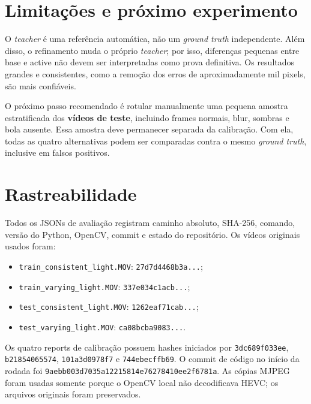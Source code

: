 \documentclass[10pt,a4paper]{article}
\begin{document}
\section{Limitações e próximo experimento}

O \textit{teacher} é uma referência automática, não um \textit{ground truth} independente.
Além disso, o refinamento muda o próprio \textit{teacher}; por isso, diferenças pequenas
entre base e active não devem ser interpretadas como prova definitiva. Os resultados
grandes e consistentes, como a remoção dos erros de aproximadamente mil pixels, são mais
confiáveis.

O próximo passo recomendado é rotular manualmente uma pequena amostra estratificada dos
\textbf{vídeos de teste}, incluindo frames normais, blur, sombras e bola ausente. Essa
amostra deve permanecer separada da calibração. Com ela, todas as quatro alternativas
podem ser comparadas contra o mesmo \textit{ground truth}, inclusive em falsos positivos.

\section{Rastreabilidade}

Todos os JSONs de avaliação registram caminho absoluto, SHA-256, comando, versão do Python,
OpenCV, commit e estado do repositório. Os vídeos originais usados foram:

\begin{itemize}
  \item \texttt{train\_consistent\_light.MOV}: \texttt{27d7d4468b3a...};
  \item \texttt{train\_varying\_light.MOV}: \texttt{337e034c1acb...};
  \item \texttt{test\_consistent\_light.MOV}: \texttt{1262eaf71cab...};
  \item \texttt{test\_varying\_light.MOV}: \texttt{ca08bcba9083...}.
\end{itemize}

Os quatro reports de calibração possuem hashes iniciados por
\texttt{3dc689f033ee}, \texttt{b21854065574}, \texttt{101a3d0978f7} e
\texttt{744ebecffb69}. O commit de código no início da rodada foi
\texttt{9aebb003d7035a12215814e76278410ee2f6781a}. As cópias MJPEG foram usadas
somente porque o OpenCV local não decodificava HEVC; os arquivos originais foram preservados.
\end{document}
